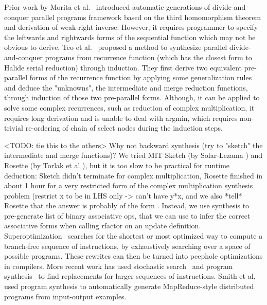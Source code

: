 Prior work by Morita et al.~\cite{Morita:2007:AIG:1250734.1250752} introduced automatic generations of divide-and-conquer parallel programs framework based on the third homomorphism theorem and derivation of weak-right inverse. However, it requires programmer to specify the leftwards and rightwards forms of the sequential function which may not be obvious to derive. Teo et al.~\cite{Teo:1997:DEP:266670.266697} proposed a method to synthesize parallel divide-and-conquer
programs from recurrence function (which has the closest form to Halide serial reduction) through induction. They first derive two equivalent pre-parallel forms of the recurrence function by applying some generalization rules and deduce the "unknowns", the intermediate and merge reduction functions, through induction of those two pre-parallel forms. Although, it can be applied to solve some complex recurrences, such as reduction of complex multiplication, it requires long derivation and is unable to deal with argmin, which requires non-trivial re-ordering of chain of select nodes during the induction steps. 

<TODO: tie this to the others>
Why not backward synthesis (try to "sketch" the intermediate and merge functions)? We tried MIT Sketch (by Solar-Lezama \cite{Solar-Lezama:2008:PSS:1714168}) and Rosette (by Torlak et al \cite{Torlak:2013:GSL:2509578.2509586}), but it is too slow to be practical for runtime deduction: Sketch didn't terminate for complex multiplication, Rosette finished in about 1 hour for a very restricted form of the complex multiplication synthesis problem (restrict x to be in LHS only -> can't have y*x, and we also *tell* Rosette that the answer is probably of the form . Instead, we use synthesis to pre-generate list of binary associative ops, that we can use to infer the correct associative forms when calling rfactor on an update definition. \\

Superoptimization~\cite{Granlund:1992:EBU:143095.143146, Massalin:1987:SLS:36206.36194} searches for the shortest or most optimized way to compute a branch-free sequence of instructions, by exhaustively searching over a space of possible programs. These rewrites can then be turned into peephole optimizations in compilers. More recent work has used stochastic search~\cite{Phothilimthana:2016:SUS:2872362.2872387, Schkufza:2013:SS:2490301.2451150} and program synthesis~\cite{Lopes:2015:PCP:2737924.2737965} to find replacements for larger sequences of instructions. Smith et al.~\cite{Smith:2016:MPS:2908080.2908102} used program synthesis to automatically generate MapReduce-style distributed programs from input-output examples. 

